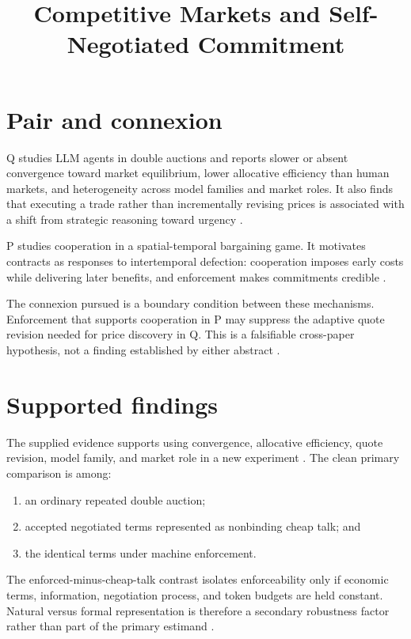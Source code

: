 \documentclass{article}
\title{Competitive Markets and Self-Negotiated Commitment}
\begin{document}
\maketitle

\section{Pair and connexion}

Q studies LLM agents in double auctions and reports slower or absent convergence toward market equilibrium, lower allocative efficiency than human markets, and heterogeneity across model families and market roles. It also finds that executing a trade rather than incrementally revising prices is associated with a shift from strategic reasoning toward urgency .

P studies cooperation in a spatial-temporal bargaining game. It motivates contracts as responses to intertemporal defection: cooperation imposes early costs while delivering later benefits, and enforcement makes commitments credible .

The connexion pursued is a boundary condition between these mechanisms. Enforcement that supports cooperation in P may suppress the adaptive quote revision needed for price discovery in Q. This is a falsifiable cross-paper hypothesis, not a finding established by either abstract .

\section{Supported findings}

The supplied evidence supports using convergence, allocative efficiency, quote revision, model family, and market role in a new experiment . The clean primary comparison is among:

\begin{enumerate}
\item an ordinary repeated double auction;
\item accepted negotiated terms represented as nonbinding cheap talk; and
\item the identical terms under machine enforcement.
\end{enumerate}

The enforced-minus-cheap-talk contrast isolates enforceability only if economic terms, information, negotiation process, and token budgets are held constant. Natural versus formal representation is therefore a secondary robustness factor rather than part of the primary estimand .
\end{document}
